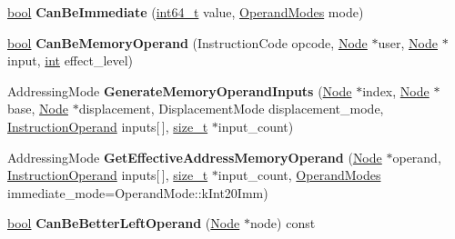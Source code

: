 \begin{DoxyCompactItemize}
\mbox{\hyperlink{classbool}{bool}} {\bfseries Can\+Be\+Immediate} (\mbox{\hyperlink{classint64__t}{int64\+\_\+t}} value, \mbox{\hyperlink{classv8_1_1base_1_1Flags}{Operand\+Modes}} mode)
\item 
\mbox{\label{classv8_1_1internal_1_1compiler_1_1S390OperandGenerator_a7006d7da579bb9502373a61182aebdde}} 
\mbox{\hyperlink{classbool}{bool}} {\bfseries Can\+Be\+Memory\+Operand} (Instruction\+Code opcode, \mbox{\hyperlink{classv8_1_1internal_1_1compiler_1_1Node}{Node}} $\ast$user, \mbox{\hyperlink{classv8_1_1internal_1_1compiler_1_1Node}{Node}} $\ast$input, \mbox{\hyperlink{classint}{int}} effect\+\_\+level)
\item 
\mbox{\label{classv8_1_1internal_1_1compiler_1_1S390OperandGenerator_ae711bccfcf88030cef2d2a2c52739f5f}} 
Addressing\+Mode {\bfseries Generate\+Memory\+Operand\+Inputs} (\mbox{\hyperlink{classv8_1_1internal_1_1compiler_1_1Node}{Node}} $\ast$index, \mbox{\hyperlink{classv8_1_1internal_1_1compiler_1_1Node}{Node}} $\ast$base, \mbox{\hyperlink{classv8_1_1internal_1_1compiler_1_1Node}{Node}} $\ast$displacement, Displacement\+Mode displacement\+\_\+mode, \mbox{\hyperlink{classv8_1_1internal_1_1compiler_1_1InstructionOperand}{Instruction\+Operand}} inputs\mbox{[}$\,$\mbox{]}, \mbox{\hyperlink{classsize__t}{size\+\_\+t}} $\ast$input\+\_\+count)
\item 
\mbox{\label{classv8_1_1internal_1_1compiler_1_1S390OperandGenerator_a64e89d20804e77198d2ff1d47100337e}} 
Addressing\+Mode {\bfseries Get\+Effective\+Address\+Memory\+Operand} (\mbox{\hyperlink{classv8_1_1internal_1_1compiler_1_1Node}{Node}} $\ast$operand, \mbox{\hyperlink{classv8_1_1internal_1_1compiler_1_1InstructionOperand}{Instruction\+Operand}} inputs\mbox{[}$\,$\mbox{]}, \mbox{\hyperlink{classsize__t}{size\+\_\+t}} $\ast$input\+\_\+count, \mbox{\hyperlink{classv8_1_1base_1_1Flags}{Operand\+Modes}} immediate\+\_\+mode=Operand\+Mode\+::k\+Int20\+Imm)
\item 
\mbox{\label{classv8_1_1internal_1_1compiler_1_1S390OperandGenerator_a50b866061ae7298013c3709d8f178f47}} 
\mbox{\hyperlink{classbool}{bool}} {\bfseries Can\+Be\+Better\+Left\+Operand} (\mbox{\hyperlink{classv8_1_1internal_1_1compiler_1_1Node}{Node}} $\ast$node) const

\end{DoxyCompactItemize}
